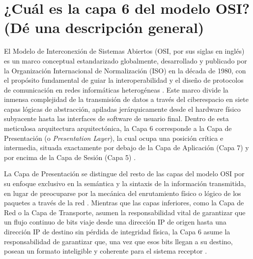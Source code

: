 \documentclass[a4paper,12pt]{article}
\begin{document}
\renewcommand{\footrulewidth}{0.4pt}  %

\setcounter{page}{1}

\tableofcontents


\newpage

\section{¿Cuál es la capa 6 del modelo OSI? (Dé una descripción general)}

El Modelo de Interconexión de Sistemas Abiertos (OSI, por sus siglas en inglés) es un marco conceptual estandarizado globalmente, desarrollado y publicado por la Organización Internacional de Normalización (ISO) en la década de 1980, con el propósito fundamental de guiar la interoperabilidad y el diseño de protocolos de comunicación en redes informáticas heterogéneas \cite{aws_osi}. Este marco divide la inmensa complejidad de la transmisión de datos a través del ciberespacio en siete capas lógicas de abstracción, apiladas jerárquicamente desde el hardware físico subyacente hasta las interfaces de software de usuario final. Dentro de esta meticulosa arquitectura arquitectónica, la Capa 6 corresponde a la Capa de Presentación (o \textit{Presentation Layer}), la cual ocupa una posición crítica e intermedia, situada exactamente por debajo de la Capa de Aplicación (Capa 7) y por encima de la Capa de Sesión (Capa 5) \cite{ibm_osi}.

La Capa de Presentación se distingue del resto de las capas del modelo OSI por su enfoque exclusivo en la semántica y la sintaxis de la información transmitida, en lugar de preocuparse por la mecánica del enrutamiento físico o lógico de los paquetes a través de la red \cite{ionos_pres}. Mientras que las capas inferiores, como la Capa de Red o la Capa de Transporte, asumen la responsabilidad vital de garantizar que un flujo continuo de bits viaje desde una dirección IP de origen hasta una dirección IP de destino sin pérdida de integridad física, la Capa 6 asume la responsabilidad de garantizar que, una vez que esos bits llegan a su destino, posean un formato inteligible y coherente para el sistema receptor \cite{paloalto_l7}. 
\end{document}
